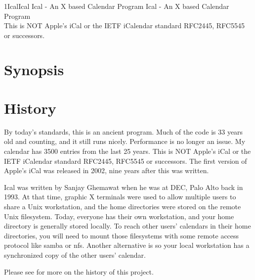 \documentclass[a4paper,english]{article}
\begin{document}
\begin{Name}{1}{Ical}{}{Ical \Version}{Ical - An X based Calendar Program}
Ical - An X based Calendar Program \\
This is NOT Apple's iCal or the IETF iCalendar standard RFC2445, RFC5545 or successors.
\end{Name}

\section{Synopsis}

 

\section{History}

By today's standards, this is an ancient program. Much of the code is
33 years old and counting, and it still runs nicely. Performance is no
longer an issue. My calendar has 3500 entries from the last 25 years.
This is NOT Apple's iCal or the IETF iCalendar standard RFC2445,
RFC5545 or successors. The first version of Apple's iCal was released
in 2002, nine years after this was written.

Ical was written by Sanjay Ghemawat when he was at DEC, Palo Alto back
in 1993. At that time, graphic X terminals were used to allow multiple
users to share a Unix workstation, and the home directories were
stored on the remote Unix filesystem. Today, everyone has their own
workstation, and your home directory is generally stored locally.  To
reach other users' calendars in their home directories, you will need
to mount those filesystems with some remote access protocol like samba
or nfs. Another alternative is  so your
local workstation has a synchronized copy of the other users'
calendar.

Please
see  for more on the history of
this project.
\end{document}
